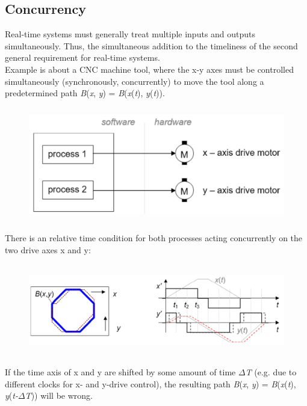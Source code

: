 \subsection{Concurrency}

Real-time systems must generally treat multiple inputs and outputs simultaneously. Thus, the simultaneous addition to the timeliness of the second general requirement for real-time systems.\\

Example is about a CNC machine tool, where the x-y axes must be controlled simultaneously (synchronously, concurrently) to move the tool along a predetermined path \textit{B}(\textit{x}, \textit{y}) = \textit{B}(\textit{x}(\textit{t}), \textit{y}(\textit{t})). 

	\begin{figure}[h]
    \centering
    \includegraphics[width=12cm, height=5cm]{Images/image68.png}
    \label{fig:Fig 14}
    \end{figure}

There is an relative time condition for both processes acting concurrently on the two drive axes x and y:

	\begin{figure}[h]
    \centering
    \includegraphics[width=14cm, height=4cm]{Images/image69.png}
    \label{fig:Fig 15}
    \end{figure}

If the time axis of x and y are shifted by some amount of time $\Delta$\textit{T} (e.g. due to different clocks for x- and y-drive control), the resulting path \textit{B}(\textit{x}, \textit{y}) = \textit{B}(\textit{x}(\textit{t}), \textit{y}(\textit{t-}$\Delta$\textit{T})) will be wrong.\\

